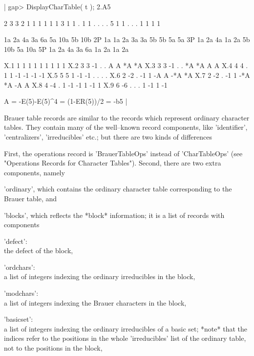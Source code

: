 \bigskip

|    gap> DisplayCharTable( t );
    2.A5

         2  3  3  2  1  1   1   1   1   1
         3  1  1  .  1  1   .   .   .   .
         5  1  1  .  .  .   1   1   1   1

           1a 2a 4a 3a 6a  5a 10a  5b 10b
        2P 1a 1a 2a 3a 3a  5b  5b  5a  5a
        3P 1a 2a 4a 1a 2a  5b 10b  5a 10a
        5P 1a 2a 4a 3a 6a  1a  2a  1a  2a

    X.1     1  1  1  1  1   1   1   1   1
    X.2     3  3 -1  .  .   A   A  *A  *A
    X.3     3  3 -1  .  .  *A  *A   A   A
    X.4     4  4  .  1  1  -1  -1  -1  -1
    X.5     5  5  1 -1 -1   .   .   .   .
    X.6     2 -2  . -1  1  -A   A -*A  *A
    X.7     2 -2  . -1  1 -*A  *A  -A   A
    X.8     4 -4  .  1 -1  -1   1  -1   1
    X.9     6 -6  .  .  .   1  -1   1  -1

    A = -E(5)-E(5)^4
      = (1-ER(5))/2 = -b5 |

\bigskip

%
%

Brauer table records are similar to the records which represent  ordinary
character  tables.   They   contain   many  of   the  well--known  record
components, like 'identifier', 'centralizers', 'irreducibles'  etc.;  but
there are two kinds of differences\:

First,   the   operations   record   is   'BrauerTableOps'   instead   of
'CharTableOps' (see "Operations Records for  Character Tables").  Second,
there are two extra components, namely

'ordinary',  which contains the ordinary character table corresponding to
the Brauer table, and

'blocks', which reflects the *block* information; it is a list of records
with components

'defect': \\
     the defect of the block,

'ordchars': \\
     a list of integers indexing the ordinary irreducibles in the block,

'modchars': \\
     a list of integers indexing the Brauer characters in the block,

'basicset': \\
     a list of integers indexing the ordinary irreducibles of a basic
     set; *note* that the indices refer to the positions in the whole
     'irreducibles' list of the ordinary table, not to the positions in
     the block,

